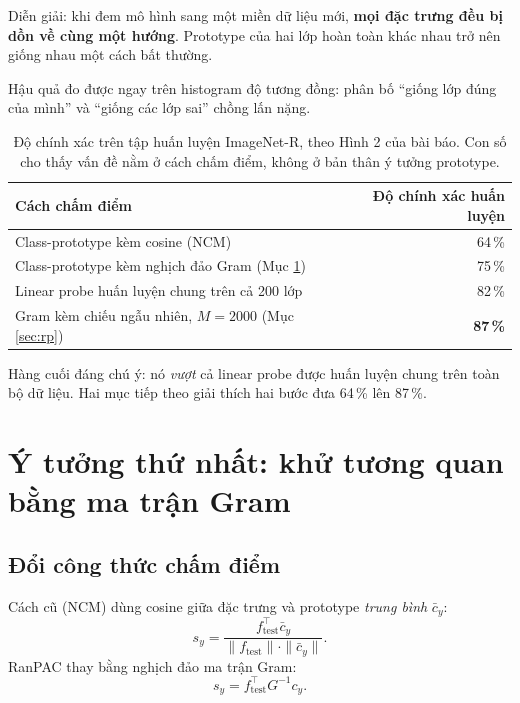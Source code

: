 \documentclass[11pt,a4paper]{article}
\begin{document}
Diễn giải: khi đem mô hình sang một miền dữ liệu mới, \textbf{mọi đặc trưng đều
bị dồn về cùng một hướng}. Prototype của hai lớp hoàn toàn khác nhau trở nên
giống nhau một cách bất thường.

Hậu quả đo được ngay trên histogram độ tương đồng: phân bố ``giống lớp đúng của
mình'' và ``giống các lớp sai'' chồng lấn nặng.

\begin{table}[htbp]
\centering
\caption{Độ chính xác trên tập huấn luyện ImageNet-R, theo Hình 2 của bài báo.
Con số cho thấy vấn đề nằm ở cách chấm điểm, không ở bản thân ý tưởng prototype.}
\label{tab:chandoan}
\begin{tabular}{lr}
\toprule
Cách chấm điểm & Độ chính xác huấn luyện \\
\midrule
Class-prototype kèm cosine (NCM)                     & 64\,\% \\
Class-prototype kèm nghịch đảo Gram (Mục \ref{sec:gram})
                                                     & 75\,\% \\
Linear probe huấn luyện chung trên cả 200 lớp        & 82\,\% \\
Gram kèm chiếu ngẫu nhiên, $M = 2000$ (Mục \ref{sec:rp})
                                                     & \textbf{87\,\%} \\
\bottomrule
\end{tabular}
\end{table}

Hàng cuối đáng chú ý: nó \emph{vượt} cả linear probe được huấn luyện chung trên
toàn bộ dữ liệu. Hai mục tiếp theo giải thích hai bước đưa 64\,\% lên 87\,\%.

\section{Ý tưởng thứ nhất: khử tương quan bằng ma trận Gram}
\label{sec:gram}

\subsection{Đổi công thức chấm điểm}

Cách cũ (NCM) dùng cosine giữa đặc trưng và prototype \emph{trung bình}
$\bar c_y$:
\begin{equation}
s_y = \frac{f_{\text{test}}^{\top} \bar c_y}
           {\|f_{\text{test}}\| \cdot \|\bar c_y\|}.
\label{eq:cosine}
\end{equation}
RanPAC thay bằng nghịch đảo ma trận Gram:
\begin{equation}
s_y = f_{\text{test}}^{\top} G^{-1} c_y .
\label{eq:gram}
\end{equation}
\end{document}
